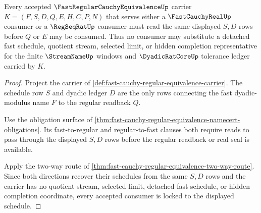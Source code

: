\begin{theorem}
\label{thm:fast-regular-cauchy-equivalence-regular-schedule-lock}
Every accepted $\FastRegularCauchyEquivalenceUp$ carrier $K=(F,S,D,Q,E,H,C,P,N)$ that serves either a $\FastCauchyRealUp$ consumer or a $\RegSeqRatUp$ consumer must read the same displayed $S,D$ rows before $Q$ or $E$ may be consumed. Thus no consumer may substitute a detached fast schedule, quotient stream, selected limit, or hidden completion representative for the finite $\StreamNameUp$ windows and $\DyadicRatCoreUp$ tolerance ledger carried by $K$.
\end{theorem}
\begin{proof}
Project the carrier of \autoref{def:fast-cauchy-regular-equivalence-carrier}. The schedule row $S$ and dyadic ledger $D$ are the only rows connecting the fast dyadic-modulus name $F$ to the regular readback $Q$.

Use the obligation surface of \autoref{thm:fast-cauchy-regular-equivalence-namecert-obligations}. Its fast-to-regular and regular-to-fast clauses both require reads to pass through the displayed $S,D$ rows before the regular readback or real seal is available.

Apply the two-way route of \autoref{thm:fast-cauchy-regular-equivalence-two-way-route}. Since both directions recover their schedules from the same $S,D$ rows and the carrier has no quotient stream, selected limit, detached fast schedule, or hidden completion coordinate, every accepted consumer is locked to the displayed schedule.
\end{proof}

